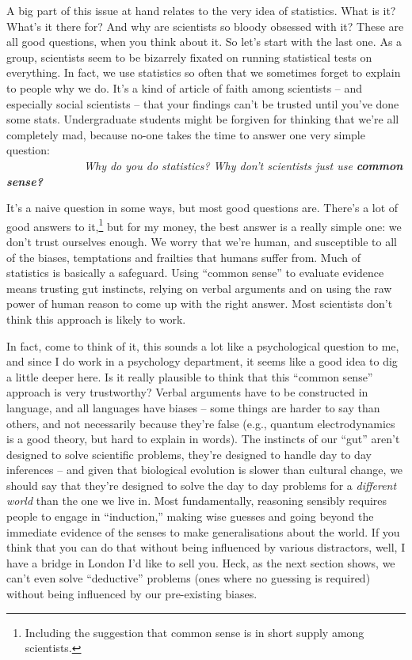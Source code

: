 \documentclass[
]{book}
\begin{document}
A big part of this issue at hand relates to the very idea of statistics. What is it? What's it there for? And why are scientists so bloody obsessed with it? These are all good questions, when you think about it. So let's start with the last one. As a group, scientists seem to be bizarrely fixated on running statistical tests on everything. In fact, we use statistics so often that we sometimes forget to explain to people why we do. It's a kind of article of faith among scientists -- and especially social scientists -- that your findings can't be trusted until you've done some stats. Undergraduate students might be forgiven for thinking that we're all completely mad, because no-one takes the time to answer one very simple question:\\

~~~~~~~~~~~~~~\emph{Why do you do statistics? Why don't scientists just use} \textbf{\emph{common sense?}}

\hfill\break
It's a naive question in some ways, but most good questions are. There's a lot of good answers to it,\footnote{Including the suggestion that common sense is in short supply among scientists.} but for my money, the best answer is a really simple one: we don't trust ourselves enough. We worry that we're human, and susceptible to all of the biases, temptations and frailties that humans suffer from. Much of statistics is basically a safeguard. Using ``common sense'' to evaluate evidence means trusting gut instincts, relying on verbal arguments and on using the raw power of human reason to come up with the right answer. Most scientists don't think this approach is likely to work.

In fact, come to think of it, this sounds a lot like a psychological question to me, and since I do work in a psychology department, it seems like a good idea to dig a little deeper here. Is it really plausible to think that this ``common sense'' approach is very trustworthy? Verbal arguments have to be constructed in language, and all languages have biases -- some things are harder to say than others, and not necessarily because they're false (e.g., quantum electrodynamics is a good theory, but hard to explain in words). The instincts of our ``gut'' aren't designed to solve scientific problems, they're designed to handle day to day inferences -- and given that biological evolution is slower than cultural change, we should say that they're designed to solve the day to day problems for a \emph{different world} than the one we live in. Most fundamentally, reasoning sensibly requires people to engage in ``induction,'' making wise guesses and going beyond the immediate evidence of the senses to make generalisations about the world. If you think that you can do that without being influenced by various distractors, well, I have a bridge in London I'd like to sell you. Heck, as the next section shows, we can't even solve ``deductive'' problems (ones where no guessing is required) without being influenced by our pre-existing biases.
\end{document}
